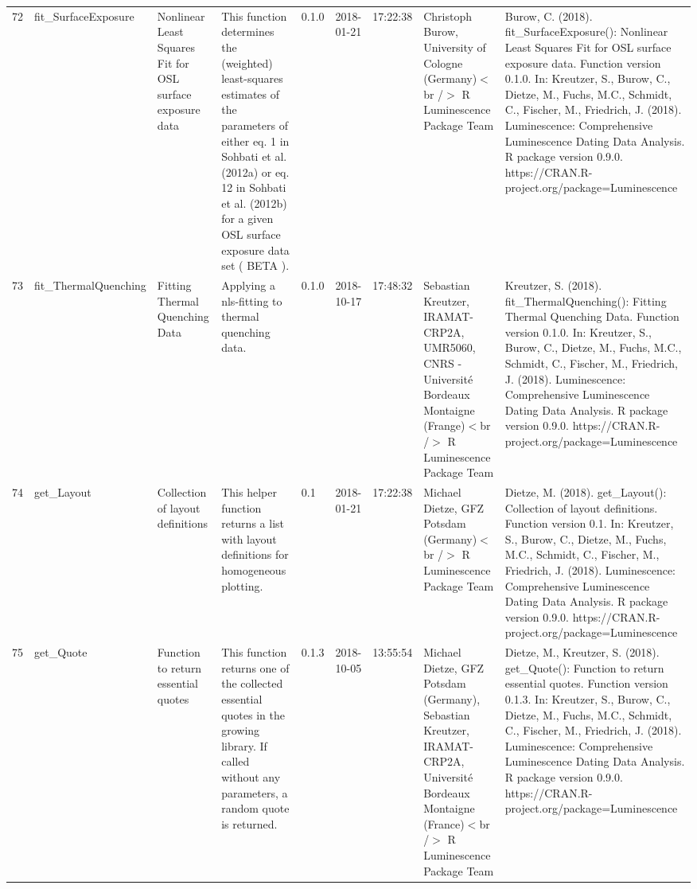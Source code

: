 \begin{table}[ht]
\begin{tabular}{rllllllll}
 \\ 
  72 & fit\_SurfaceExposure & Nonlinear Least Squares Fit for OSL surface exposure data & This function determines the (weighted) least-squares estimates of the parameters of either eq. 1 in  Sohbati et al. (2012a)  or eq. 12 in Sohbati et al. (2012b)  for a given OSL surface exposure data set ( BETA ). & 0.1.0 & 2018-01-21 & 17:22:38
 & Christoph Burow, University of Cologne (Germany)$<$br /$>$  R Luminescence Package Team & Burow, C. (2018). fit\_SurfaceExposure(): Nonlinear Least Squares Fit for OSL surface exposure data. Function version 0.1.0. In: Kreutzer, S., Burow, C., Dietze, M., Fuchs, M.C., Schmidt, C., Fischer, M., Friedrich, J. (2018). Luminescence: Comprehensive Luminescence Dating Data Analysis. R package version 0.9.0. https://CRAN.R-project.org/package=Luminescence
 \\ 
  73 & fit\_ThermalQuenching & Fitting Thermal Quenching Data & Applying a nls-fitting to thermal quenching data. & 0.1.0 & 2018-10-17 & 17:48:32
 & Sebastian Kreutzer, IRAMAT-CRP2A, UMR5060, CNRS - Université Bordeaux Montaigne (Frange)$<$br /$>$  R Luminescence Package Team & Kreutzer, S. (2018). fit\_ThermalQuenching(): Fitting Thermal Quenching Data. Function version 0.1.0. In: Kreutzer, S., Burow, C., Dietze, M., Fuchs, M.C., Schmidt, C., Fischer, M., Friedrich, J. (2018). Luminescence: Comprehensive Luminescence Dating Data Analysis. R package version 0.9.0. https://CRAN.R-project.org/package=Luminescence
 \\ 
  74 & get\_Layout & Collection of layout definitions & This helper function returns a list with layout definitions for homogeneous plotting. & 0.1 & 2018-01-21 & 17:22:38
 & Michael Dietze, GFZ Potsdam (Germany)$<$br /$>$  R Luminescence Package Team & Dietze, M. (2018). get\_Layout(): Collection of layout definitions. Function version 0.1. In: Kreutzer, S., Burow, C., Dietze, M., Fuchs, M.C., Schmidt, C., Fischer, M., Friedrich, J. (2018). Luminescence: Comprehensive Luminescence Dating Data Analysis. R package version 0.9.0. https://CRAN.R-project.org/package=Luminescence
 \\ 
  75 & get\_Quote & Function to return essential quotes & This function returns one of the collected essential quotes in the growing library. If called without any parameters, a random quote is returned. & 0.1.3 & 2018-10-05 & 13:55:54
 & Michael Dietze, GFZ Potsdam (Germany), Sebastian Kreutzer, IRAMAT-CRP2A, Université Bordeaux Montaigne (France)$<$br /$>$  R Luminescence Package Team & Dietze, M., Kreutzer, S. (2018). get\_Quote(): Function to return essential quotes. Function version 0.1.3. In: Kreutzer, S., Burow, C., Dietze, M., Fuchs, M.C., Schmidt, C., Fischer, M., Friedrich, J. (2018). Luminescence: Comprehensive Luminescence Dating Data Analysis. R package version 0.9.0. https://CRAN.R-project.org/package=Luminescence

\end{tabular}
\end{table}
